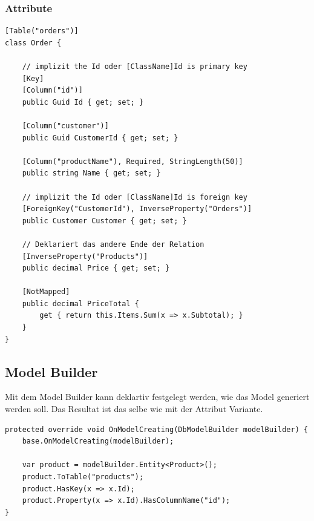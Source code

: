 \subsubsection{Attribute}
\begin{lstlisting}
[Table("orders")]
class Order {

	// implizit the Id oder [ClassName]Id is primary key
	[Key]
	[Column("id")]
	public Guid Id { get; set; }
	
	[Column("customer")]
	public Guid CustomerId { get; set; }
	
	[Column("productName"), Required, StringLength(50)]
	public string Name { get; set; }
	
	// implizit the Id oder [ClassName]Id is foreign key
	[ForeignKey("CustomerId"), InverseProperty("Orders")]
	public Customer Customer { get; set; }
	
	// Deklariert das andere Ende der Relation
	[InverseProperty("Products")]
	public decimal Price { get; set; }
	
	[NotMapped]
	public decimal PriceTotal {
		get { return this.Items.Sum(x => x.Subtotal); }
	}
}
\end{lstlisting}

\subsection{Model Builder}
Mit dem Model Builder kann deklartiv festgelegt werden, wie das Model generiert werden soll. Das Resultat ist das selbe wie mit der Attribut Variante. 
\begin{lstlisting}
protected override void OnModelCreating(DbModelBuilder modelBuilder) {
	base.OnModelCreating(modelBuilder);
	
	var product = modelBuilder.Entity<Product>();
	product.ToTable("products");
	product.HasKey(x => x.Id);
	product.Property(x => x.Id).HasColumnName("id");
}
\end{lstlisting}

